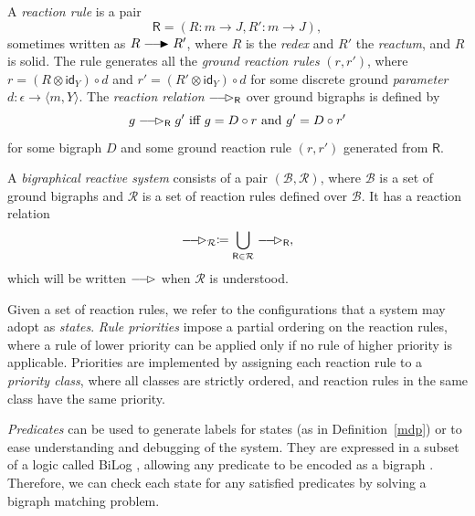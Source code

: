 \documentclass[runningheads]{llncs}
\newcommand\id{\mathsf{id}}
\providecommand\longrightarrowRHD{\relbar\joinrel\relbar\joinrel\mathrel\RHD}
\providecommand\longrightarrowrhd{\relbar\joinrel\relbar\joinrel\mathrel\rhd}
\begin{document}
\begin{definition} \label{reaction_rule}
  A \emph{reaction rule} is a pair
  \[ \mathsf{R} = (R : m \to J, R' : m \to J), \]
  sometimes written as $R \longrightarrowRHD R'$, where $R$ is the \emph{redex}
  and $R'$ the \emph{reactum}, and $R$ is solid. The rule generates all the
  \emph{ground reaction rules} $(r, r')$, where $r = (R \otimes \id_Y) \circ d$
  and $r' = (R' \otimes \id_Y) \circ d$ for some discrete ground
  \emph{parameter} $d : \epsilon \to \langle m, Y \rangle$. The \emph{reaction
    relation} $\longrightarrowrhd_{\mathsf{R}}$ over ground bigraphs is defined
  by
  \[ g \longrightarrowrhd_{\mathsf{R}} g' \text{ iff } g = D \circ r \text{ and
    } g' = D \circ r' \]
  for some bigraph $D$ and some ground reaction rule $(r, r')$ generated from
  $\mathsf{R}$.
\end{definition}

\begin{definition}
  A \emph{bigraphical reactive system} consists of a pair $(\mathcal{B},
  \mathcal{R})$, where $\mathcal{B}$ is a set of ground bigraphs and
  $\mathcal{R}$ is a set of reaction rules defined over $\mathcal{B}$. It has a
  reaction relation
  \[ \longrightarrowrhd_{\mathcal{R}} \coloneqq \bigcup_{\mathsf{R} \in
      \mathcal{R}} \longrightarrowrhd_{\mathsf{R}}, \]
  which will be written $\longrightarrowrhd$ when $\mathcal{R}$ is understood.
\end{definition}

Given a set of reaction rules, we refer to the configurations that a system may
adopt as \emph{states}. \emph{Rule priorities}
\cite{DBLP:journals/tcs/BaetenBKW89} impose a partial ordering on the reaction
rules, where a rule of lower priority can be applied only if no rule of higher
priority is applicable. Priorities are implemented by assigning each reaction
rule to a \emph{priority class}, where all classes are strictly ordered, and
reaction rules in the same class have the same priority.

\emph{Predicates} can be used to generate labels for states (as in
Definition~\ref{mdp}) or to ease understanding and debugging of the system. They
are expressed in a subset of a logic called BiLog
\cite{DBLP:conf/icalp/ConfortiMS05}, allowing any predicate to be encoded as a
bigraph \cite{DBLP:journals/scp/CalderKSS14,DBLP:phd/ethos/Sevegnani12}.
Therefore, we can check each state for any satisfied predicates by solving a
bigraph matching problem.
\end{document}
